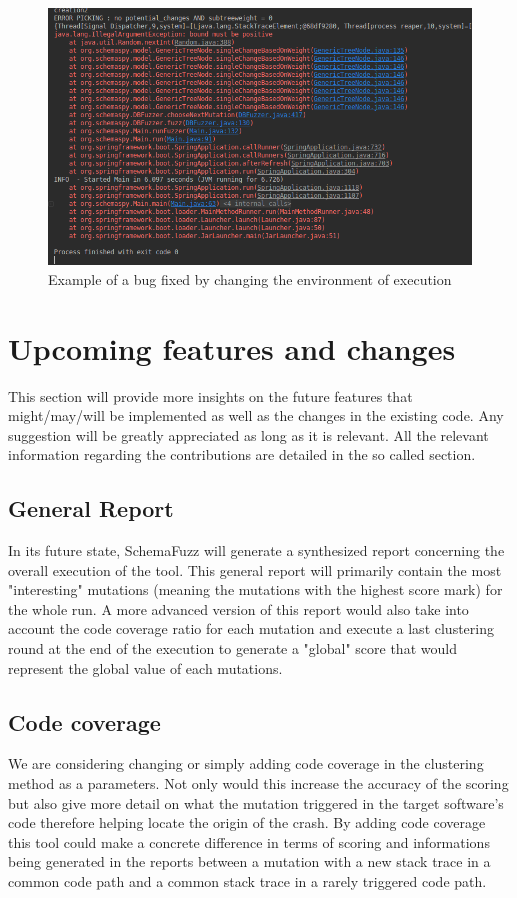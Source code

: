 \documentclass{article}
\begin{document}
\begin{empfile}
		\bigskip
		\begin{figure} [h!]
			\includegraphics[width=\textwidth]{sc4.png}
			\caption{Example of a bug fixed by changing the environment of execution}
		\end{figure}
		\bigskip
   	       		
		
			\clearpage
	\section{Upcoming features and changes}
This section will provide more insights on the future features that might/may/will be implemented as well as the changes in the existing code.
Any suggestion will be greatly appreciated as long as it is relevant. All the relevant information regarding the contributions are detailed in the so called section.

		\subsection{General Report}
In its future state, SchemaFuzz will generate a synthesized report concerning the overall execution of the tool. This general report will primarily contain the most "interesting" mutations (meaning the mutations with the highest score mark) for the whole run.
A more advanced version of this report would also take into account the code coverage ratio for each mutation and execute a last clustering round at the end of the execution to generate a "global" score that would represent the global value of each mutations.
	
		\subsection{Code coverage}
We are considering changing or simply adding code coverage in the clustering method as a parameters. Not only would this increase the accuracy of the scoring but also give more detail on what the mutation triggered in the target software's code therefore helping locate the origin of the crash. By adding code coverage this tool could make a concrete difference in terms of scoring and informations being generated in the reports between a mutation with a new stack trace in a common code path and a common stack trace in a rarely triggered code path.


\end{empfile}
\end{document}
